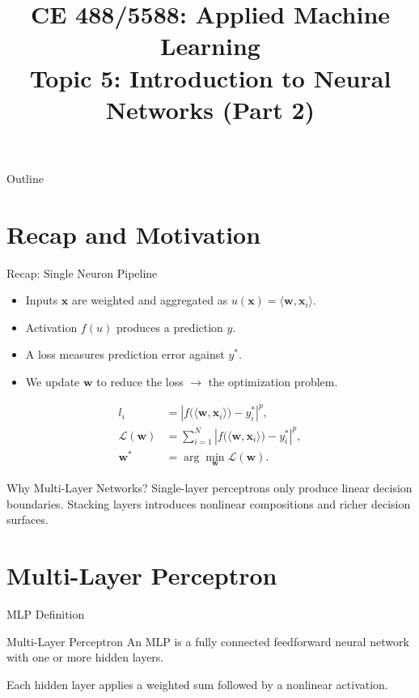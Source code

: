 \documentclass[10pt]{beamer}
\title[Topic 5 Part 2]{CE 488/5588: Applied Machine Learning\\\large Topic 5: Introduction to Neural Networks (Part 2)}
\author{}
\date{}
\begin{document}
\begin{frame}[plain]
  \titlepage
\end{frame}

\begin{frame}{Outline}
  \justifying
  \tableofcontents
\end{frame}

\section{Recap and Motivation}

\begin{frame}{Recap: Single Neuron Pipeline}
  \justifying
  \begin{itemize}
    \item Inputs $\bm{x}$ are weighted and aggregated as $u(\bm{x}) = \langle \bm{w}, \bm{x}_i \rangle$.
    \item Activation $f(u)$ produces a prediction $y$.
    \item A loss measures prediction error against $y^*$.
    \item We update $\bm{w}$ to reduce the loss $\rightarrow$ the optimization problem. 
  \end{itemize}

  \[
    \begin{aligned}
      l_i &= \left| f\bigl(\langle \bm{w}, \bm{x}_i \rangle\bigr) - y_i^* \right|^p,\\
      \mathcal{L}(\bm{w}) &= \sum_{i=1}^{N} \left| f\bigl(\langle \bm{w}, \bm{x}_i \rangle\bigr) - y_i^* \right|^p,\\
      \bm{w}^* &= \arg \min_{\bm{w}} \mathcal{L}(\bm{w}).
    \end{aligned}
  \]


\end{frame}

\begin{frame}{Why Multi-Layer Networks?}
  \justifying
  Single-layer perceptrons only produce linear decision boundaries.
  Stacking layers introduces nonlinear compositions and richer decision surfaces.
\end{frame}

\section{Multi-Layer Perceptron}

\begin{frame}{MLP Definition}
  \justifying
  \begin{conceptbox}{Multi-Layer Perceptron}
    An MLP is a fully connected feedforward neural network with one or more hidden layers.
  \end{conceptbox}
  Each hidden layer applies a weighted sum followed by a nonlinear activation.
\end{frame}
\end{document}
